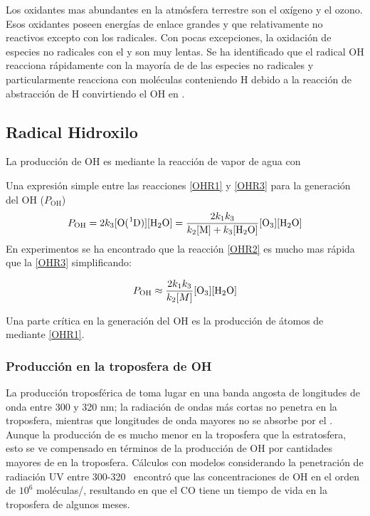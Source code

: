 Los oxidantes mas abundantes en la atmósfera terrestre son el oxígeno y el ozono. Esos oxidantes poseen energías de enlace grandes y que relativamente no reactivos excepto con los radicales. Con pocas excepciones, la oxidación de especies no radicales con el  y  son muy lentas. Se ha identificado que el radical OH reacciona rápidamente con la mayoría de de las especies no radicales y particularmente reacciona con moléculas conteniendo H debido a la reacción de abstracción de H convirtiendo el OH en . 

\subsection{Radical Hidroxilo}

La producción de OH es mediante la reacción de vapor de agua con 


Una expresión simple entre las reacciones \ref{OHR1} y \ref{OHR3}  para la generación del OH  ($P_\mathrm{OH}$) 
\begin{equation}
P_\mathrm{OH}= 2k_3 [\ce{O(^1D)}] [\ce{H2O}] = \frac{2k_1k_3}{k_2[\mathrm{M]}+k_3[\ce{H2O}]} [\ce{O3}][\ce{H2O}] 
\end{equation}
En experimentos se ha encontrado que la reacción \ref{OHR2} es mucho mas rápida que la \ref{OHR3} simplificando:

\begin{equation}
P_\mathrm{OH} \approx  \frac{2k_1k_3}{ k_2[M] } [\ce{O3}]  [\ce{H2O}] 
\end{equation}

Una parte crítica en la generación del OH es la producción de átomos de    mediante \ref{OHR1}. 

\subsubsection{Producci\'on en la troposfera de OH}
La producción troposférica de  toma lugar en una  banda angosta de longitudes de onda entre 300 y 320 nm; la radiación de ondas más cortas no penetra en la troposfera, mientras que longitudes de onda mayores no se absorbe por el . Aunque la producción de  es mucho menor en la troposfera que la estratosfera, esto se ve compensado en términos de la producción de OH por cantidades mayores de  en la troposfera. Cálculos con modelos considerando la penetración de radiación UV entre 300-320 \nano\metre\,  encontró que las concentraciones de OH en el orden de $10^6$ moléculas/\cubic\metre, resultando en que el CO tiene un tiempo de vida en la troposfera de algunos meses.
